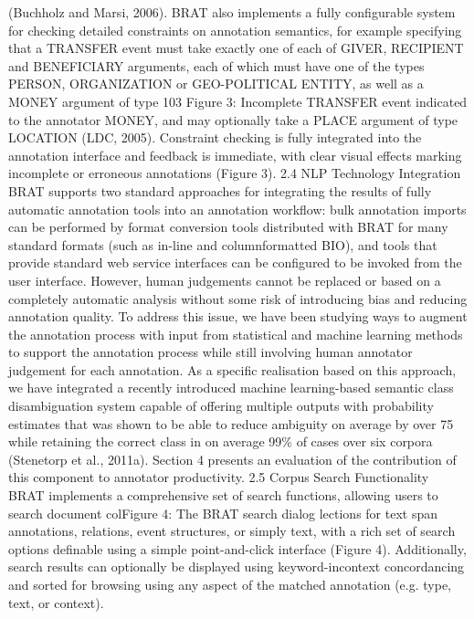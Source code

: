 \begin{description}
    (Buchholz and Marsi, 2006).
    BRAT also implements a fully configurable system for checking detailed constraints on annotation semantics, for example specifying that a
    TRANSFER event must take exactly one of each
    of GIVER, RECIPIENT and BENEFICIARY arguments, each of which must have one of the types
    PERSON, ORGANIZATION or GEO-POLITICAL
    ENTITY, as well as a MONEY argument of type
    103
    Figure 3: Incomplete TRANSFER event indicated
    to the annotator
    MONEY, and may optionally take a PLACE argument of type LOCATION (LDC, 2005). Constraint
    checking is fully integrated into the annotation interface and feedback is immediate, with clear visual effects marking incomplete or erroneous annotations (Figure 3).
    2.4 NLP Technology Integration
    BRAT supports two standard approaches for integrating the results of fully automatic annotation
    tools into an annotation workflow: bulk annotation imports can be performed by format conversion tools distributed with BRAT for many
    standard formats (such as in-line and columnformatted BIO), and tools that provide standard
    web service interfaces can be configured to be invoked from the user interface.
    However, human judgements cannot be replaced or based on a completely automatic analysis without some risk of introducing bias and reducing annotation quality. To address this issue,
    we have been studying ways to augment the annotation process with input from statistical and
    machine learning methods to support the annotation process while still involving human annotator
    judgement for each annotation.
    As a specific realisation based on this approach,
    we have integrated a recently introduced machine learning-based semantic class disambiguation system capable of offering multiple outputs
    with probability estimates that was shown to be
    able to reduce ambiguity on average by over 75%
    while retaining the correct class in on average
    99\% of cases over six corpora (Stenetorp et al.,
    2011a). Section 4 presents an evaluation of the
    contribution of this component to annotator productivity.
    2.5 Corpus Search Functionality
    BRAT implements a comprehensive set of search
    functions, allowing users to search document colFigure 4: The BRAT search dialog
    lections for text span annotations, relations, event
    structures, or simply text, with a rich set of search
    options definable using a simple point-and-click
    interface (Figure 4). Additionally, search results
    can optionally be displayed using keyword-incontext concordancing and sorted for browsing
    using any aspect of the matched annotation (e.g.
    type, text, or context).
    

\end{description}
